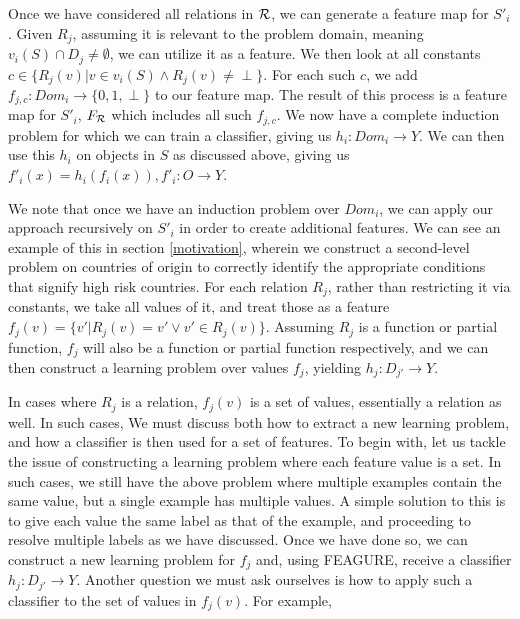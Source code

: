 \documentclass[twoside,11pt]{article}
\theoremstyle{definition}
\begin{document}
Once we have considered all relations in ${\cal R}$, we can generate a feature map for $S'_i$. Given $R_j$, assuming it is relevant to the problem domain, meaning $v_i(S)\cap D_j\neq\emptyset$, we can utilize it as a feature. We then look at all constants $c\in \{R_j(v)|v\in v_i(S)\land R_j(v)\neq \perp\}$. For each such $c$, we add $f_{j,c}:Dom_i\rightarrow \{0,1,\perp\}$ to our feature map. The result of this process is a feature map for $S'_i$, $F_{\cal R}$ which includes all such $f_{j,c}$. We now have a complete induction problem for which we can train a classifier, giving us $h_i:Dom_i\rightarrow Y$. We can then use this $h_i$ on objects in $S$ as discussed above, giving us $f'_{i}(x)=h_{i}(f_{i}(x)), f'_{i}:O\rightarrow Y$. 

We note that once we have an induction problem over $Dom_i$, we can apply our approach recursively on $S'_i$ in order to create additional features. We can see an example of this in section \ref{motivation}, wherein we construct a second-level problem on countries of origin to correctly identify the appropriate conditions that signify high risk countries.
 For each relation $R_j$, rather than restricting it via constants, we take all values of it, and treat those as a feature $f_j(v)=\{v'|R_j(v)=v' \lor v'\in R_j(v) \}$. Assuming $R_j$ is a function or partial function, $f_j$ will also be a function or partial function respectively, and we can then construct a learning problem over values $f_j$, yielding $h_j:D_{j'}\rightarrow Y$. 
 
 In cases where $R_j$ is a relation, $f_j(v)$ is a set of values, essentially a relation as well. In such cases, We must discuss both how to extract a new learning problem, and how a classifier is then used for a set of features.
 To begin with, let us tackle the issue of constructing a learning problem where each feature value is a set. In such cases, we still have the above problem where multiple examples contain the same value, but a single example has multiple values. A simple solution to this is to give each value the same label as that of the example, and proceeding to resolve multiple labels as we have discussed. 
 Once we have done so, we can construct a new learning problem for $f_j$ and, using FEAGURE, receive a classifier $h_j:D_{j'}\rightarrow Y$.
 Another question we must ask ourselves is how to apply such a classifier to the set of values in $f_j(v)$. For example, %
\end{document}
